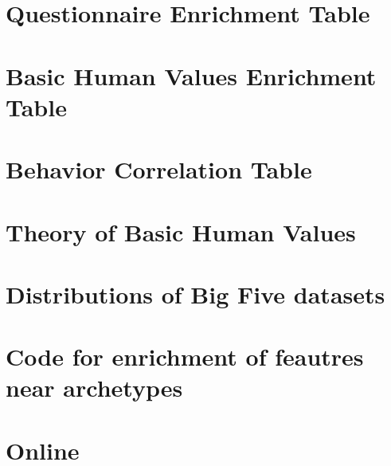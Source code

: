 \documentclass[a4paper]{article}
\begin{document}
\section{Questionnaire Enrichment Table \label{app:questionnaireEnrichmentTable}}
\thispagestyle{plain}

\newpage

\section{Basic Human Values Enrichment Table \label{app:valuesEnrichmentTable}}
\thispagestyle{plain}

\newpage

\section{Behavior Correlation Table \label{app:behaviorCorrelationTable}}
\thispagestyle{plain}

\newpage

\section{Theory of Basic Human Values \label{app:theoryOfBasicHumanValues}}
\thispagestyle{plain}

\newpage

\section{Distributions of Big Five datasets \label{app:BFdist}}
\thispagestyle{plain}

\newpage

\section{Code for enrichment of feautres near archetypes \label{app:enrichment_code}}
\thispagestyle{plain}

\newpage

\section{Online \label{app:onlineAppendix1}}
\thispagestyle{plain}

\newpage
\end{document}
